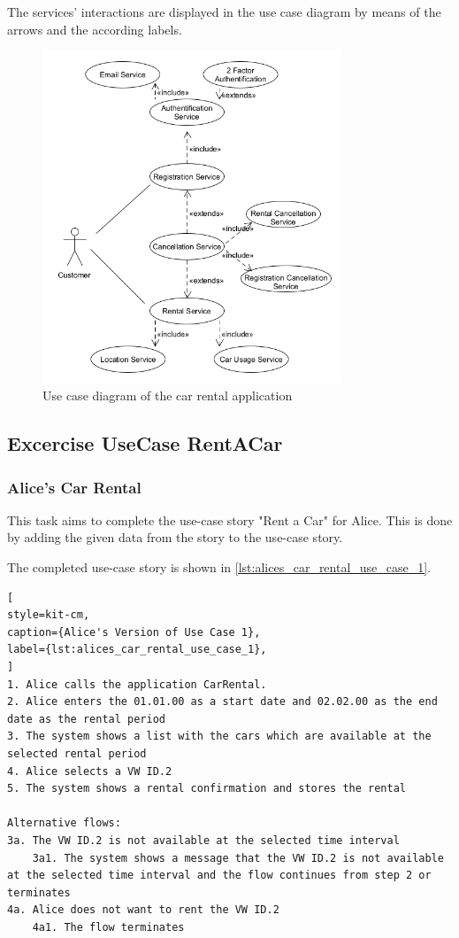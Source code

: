 The services' interactions are displayed in the use case diagram by means of the arrows and the according labels.
\begin{figure}[H]
    \centering
    \includegraphics[width=0.8\textwidth]{figures/goLang/carRental/carRental_umlDiagram.png}
    \caption{Use case diagram of the car rental application}
    \label{fig:car_rental_use_case_diagram}
\end{figure}

\subsection{Excercise UseCase RentACar}
\label{sec:exercise_use_case_rent_a_car}
\subsubsection*{Alice's Car Rental}
This task aims to complete the use-case story "Rent a Car" for Alice.
This is done by adding the given data from the story to the use-case story.

The completed use-case story is shown in \autoref{lst:alices_car_rental_use_case_1}.

\begin{lstlisting}[
style=kit-cm,
caption={Alice's Version of Use Case 1},
label={lst:alices_car_rental_use_case_1},
]
1. Alice calls the application CarRental.
2. Alice enters the 01.01.00 as a start date and 02.02.00 as the end date as the rental period
3. The system shows a list with the cars which are available at the selected rental period
4. Alice selects a VW ID.2
5. The system shows a rental confirmation and stores the rental

Alternative flows:
3a. The VW ID.2 is not available at the selected time interval
    3a1. The system shows a message that the VW ID.2 is not available at the selected time interval and the flow continues from step 2 or terminates
4a. Alice does not want to rent the VW ID.2
    4a1. The flow terminates
\end{lstlisting}
